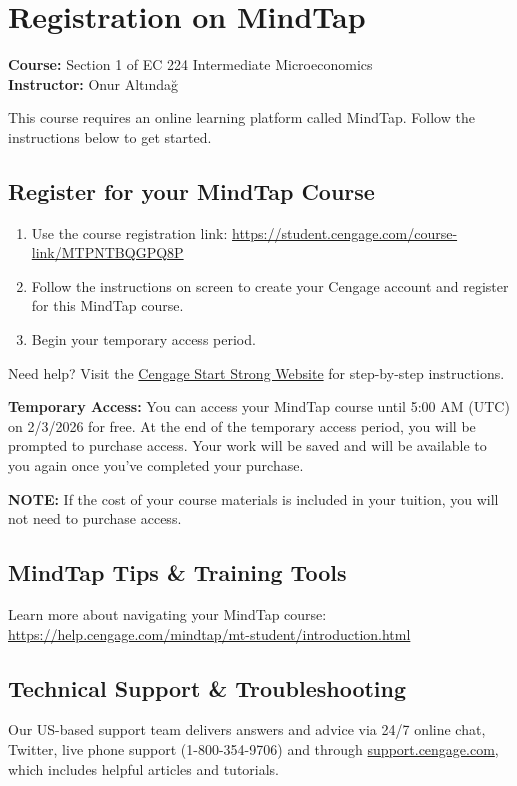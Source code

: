 \documentclass[11pt,letterpaper]{article}
\begin{document}
\section*{Registration on MindTap}

\textbf{Course:} Section 1 of EC 224 Intermediate Microeconomics\\
\textbf{Instructor:} Onur Altındağ

This course requires an online learning platform called MindTap. Follow the instructions below to get started.

\subsection*{Register for your MindTap Course}
\begin{enumerate}
    \item Use the course registration link: \url{https://student.cengage.com/course-link/MTPNTBQGPQ8P}
    \item Follow the instructions on screen to create your Cengage account and register for this MindTap course.
    \item Begin your temporary access period.
\end{enumerate}

Need help? Visit the \href{https://startstrong.cengage.com}{Cengage Start Strong Website} for step-by-step instructions.

\textbf{Temporary Access:} You can access your MindTap course until 5:00 AM (UTC) on 2/3/2026 for free. At the end of the temporary access period, you will be prompted to purchase access. Your work will be saved and will be available to you again once you've completed your purchase.

\textbf{NOTE:} If the cost of your course materials is included in your tuition, you will not need to purchase access.

\subsection*{MindTap Tips \& Training Tools}
Learn more about navigating your MindTap course: \url{https://help.cengage.com/mindtap/mt-student/introduction.html}

\subsection*{Technical Support \& Troubleshooting}
Our US-based support team delivers answers and advice via 24/7 online chat, Twitter, live phone support (1-800-354-9706) and through \href{https://support.cengage.com}{support.cengage.com}, which includes helpful articles and tutorials.
\end{document}
